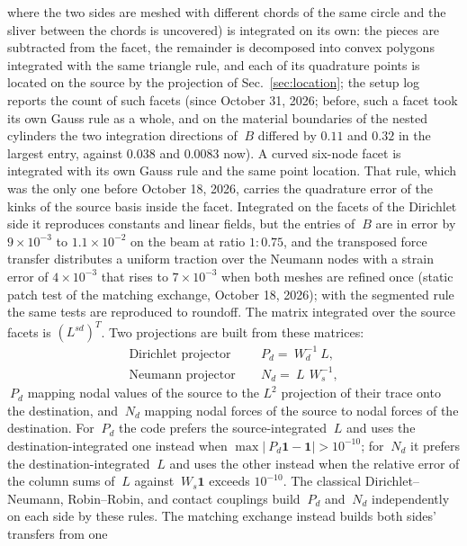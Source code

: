 \documentclass[11pt]{article}
\begin{document}
where the two sides are meshed with different chords of the same circle and
the sliver between the chords is uncovered) is integrated on its own: the
pieces are subtracted from the facet, the remainder is decomposed into
convex polygons integrated with the same triangle rule, and each of its
quadrature points is located on the source by the projection of
Sec.~\ref{sec:location}; the setup log reports the count of such facets
(since October 31, 2026; before, such a facet took its own Gauss rule as a
whole, and on the material boundaries of the nested cylinders the two
integration directions of $~B$ differed by $0.11$ and $0.32$ in the
largest entry, against $0.038$ and $0.0083$ now). A curved six-node facet
is integrated with its own Gauss rule and the same point location. That
rule, which was the only one before October 18, 2026, carries
the quadrature error of the kinks of the source basis inside the facet.
Integrated on the facets of the Dirichlet side it reproduces constants and
linear fields, but the entries of $~B$ are in error by $9\times 10^{-3}$
to $1.1\times 10^{-2}$ on the beam at ratio $1{:}0.75$, and the
transposed force transfer distributes a uniform traction over the Neumann
nodes with a strain error of $4\times 10^{-3}$ that rises to
$7\times 10^{-3}$ when both meshes are refined once (static patch test of
the matching exchange, October 18, 2026); with the segmented rule the same
tests are reproduced to roundoff. The matrix integrated over the source facets is $(L^{s d})^T$.
Two projections are built from these matrices:
\begin{align}
  \text{Dirichlet projector}\quad & ~P_d = ~W_d^{-1} ~L, \label{eq:dirichlet-projector} \\
  \text{Neumann projector}\quad & ~N_d = ~L\, ~W_s^{-1}, \label{eq:neumann-projector}
\end{align}
$~P_d$ mapping nodal values of the source to the $L^2$ projection of their
trace onto the destination, and $~N_d$ mapping nodal forces of the source
to nodal forces of the destination. For $~P_d$ the code prefers the
source-integrated $~L$ and uses the destination-integrated one instead
when $\max|~P_d \mathbf{1} - \mathbf{1}| > 10^{-10}$; for $~N_d$ it prefers
the destination-integrated $~L$ and uses the other instead when the
relative error of the column sums of $~L$ against $~W_s \mathbf{1}$ exceeds
$10^{-10}$. The classical Dirichlet--Neumann, Robin--Robin, and contact
couplings build $~P_d$ and $~N_d$ independently on each side by these
rules. The matching exchange instead builds both sides' transfers from one
\end{document}
